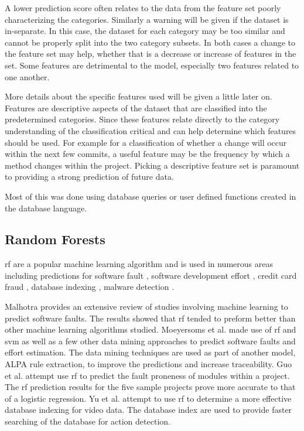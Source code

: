 A lower prediction score often relates to the data from the feature set poorly characterizing the categories. Similarly a warning will be given if the dataset is in-separate. In this case, the dataset for each category may be too similar and cannot be properly split into the two category subsets. In both cases a change to the feature set may help, whether that is a decrease or increase of features in the set. Some features are detrimental to the model, especially two features related to one another. %

More details about the specific features used will be given a little later on. Features are descriptive aspects of the dataset that are classified into the predetermined categories. Since these features relate directly to the category understanding of the classification critical and can help determine which features should be used. For example for a classification of whether a change will occur within the next few commits, a useful feature may be the frequency by which a method changes within the project. Picking a descriptive feature set is paramount to providing a strong prediction of future data.


Most of this was done using database queries or user defined functions created in the database language.

\subsection{Random Forests}
\label{subsec:random_forest_predictions}

\gls{rf} are a popular machine learning algorithm and is used in numerous areas including predictions for software fault \cite{Malhotra2015, Moeyersoms2015, Guo2004}, software development effort \cite{Moeyersoms2015}, credit card fraud \cite{Westland2011}, database indexing \cite{Yu2011}, malware detection \cite{Alam2013}. 

Malhotra provides an extensive review of studies involving machine learning to predict software faults. The results showed that \gls{rf} tended to preform better than other machine learning algorithms studied. Moeyersoms et al. made use of \gls{rf} and \gls{svm} as well as a few other data mining approaches to predict software faults and effort estimation. The data mining techniques are used as part of another model, ALPA rule extraction, to improve the predictions and increase traceability. Guo et al. attempt use \gls{rf} to predict the fault proneness of modules within a project. The \gls{rf} prediction results for the five sample projects prove more accurate to that of a logistic regression. Yu et al. attempt to use \gls{rf} to determine a more effective database indexing for video data. The database index are used to provide faster searching of the database for action detection.

